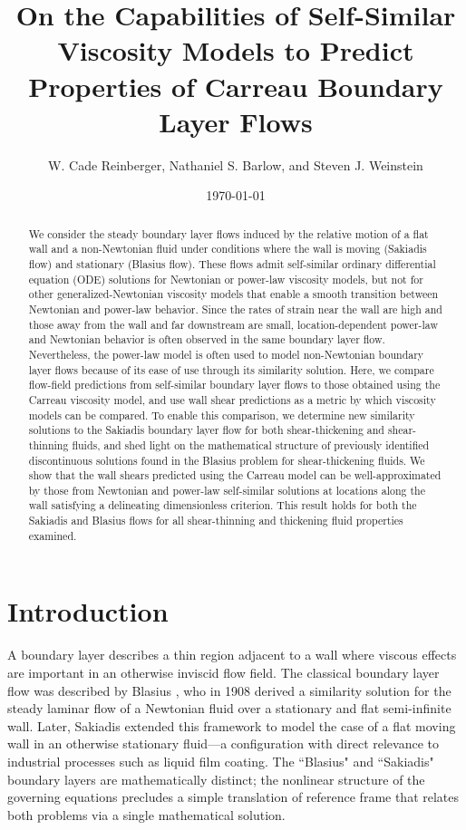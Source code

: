 \documentclass{article}
\title{On the Capabilities of Self-Similar Viscosity Models to Predict Properties of Carreau Boundary Layer Flows}
\author{W. Cade Reinberger, Nathaniel S. Barlow, and Steven J. Weinstein}
\date{\today}
\begin{document}
\maketitle

\begin{abstract}
   We consider the steady boundary layer flows induced by the relative motion of a flat wall and a non-Newtonian fluid under conditions where the wall is moving (Sakiadis flow) and stationary (Blasius flow). These flows admit self-similar ordinary differential equation (ODE) solutions for Newtonian or power-law viscosity models, but not for other generalized-Newtonian viscosity models that enable a smooth transition between Newtonian and power-law behavior.  Since the rates of strain near the wall are high and those away from the wall and far downstream are small, location-dependent power-law and Newtonian behavior is often observed in the same boundary layer flow.  Nevertheless, the power-law model is often used to model non-Newtonian boundary layer flows because of its ease of use through its similarity solution.  Here, we compare flow-field predictions from self-similar boundary layer flows to those obtained using the Carreau viscosity model, and use wall shear predictions as a metric by which viscosity models can be compared.  To enable this comparison, we determine new similarity solutions to the Sakiadis boundary layer flow for both shear-thickening and shear-thinning fluids, and shed light on the mathematical structure of previously identified discontinuous solutions found in the Blasius problem for shear-thickening fluids. We show that the wall shears predicted using the Carreau model can be well-approximated by those from Newtonian and power-law self-similar solutions at locations along the wall satisfying a delineating dimensionless criterion. This result holds for both the Sakiadis and Blasius flows for all shear-thinning and thickening fluid properties examined.
\end{abstract}

\section{Introduction}

\hspace{\parindent} A boundary layer describes a thin region adjacent to a wall where viscous effects are important in an otherwise inviscid flow field. The classical boundary layer flow was described by Blasius \cite{Blasius}, who in 1908 derived a similarity solution for the steady laminar flow of a Newtonian fluid over a stationary and flat semi-infinite wall. Later, Sakiadis \cite{Sakiadis1961a} extended this framework to model the case of a flat moving wall in an otherwise stationary fluid---a configuration with direct relevance to industrial processes such as liquid film coating. The ``Blasius" and ``Sakiadis" boundary layers are mathematically distinct; the nonlinear structure of the governing equations precludes a simple translation of reference frame that relates both problems via a single mathematical solution.
\end{document}
